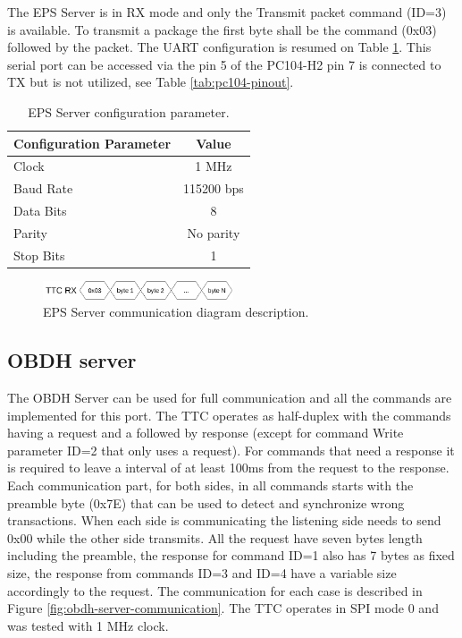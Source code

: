The EPS Server is in RX mode and only the Transmit packet command (ID=3) is available. To transmit a package the first byte shall be the command (0x03) followed by the packet. The UART configuration is resumed on Table \ref{tab:eps_config}. This serial port can be accessed via the pin 5 of the PC104-H2 pin 7 is connected to TX but is not utilized, see Table \ref{tab:pc104-pinout}.


\begin{table}[!ht]
    \centering
    \begin{tabular}{lc}
        \toprule[1.5pt]
        \textbf{Configuration Parameter} & \textbf{Value}\\
        \midrule
        Clock               & 1 MHz       \\
        Baud Rate           & 115200 bps  \\
        Data Bits           & 8           \\
        Parity              & No parity   \\
        Stop Bits           & 1           \\
        \bottomrule[1.5pt]
    \end{tabular}
    \caption{EPS Server configuration parameter.}
    \label{tab:eps_config}
\end{table}

\begin{figure}[!ht]
    \begin{center}
        \includegraphics[width=0.5\textwidth]{figures/eps_communication.drawio.png}
        \caption{EPS Server communication diagram description.}
        \label{fig:eps-server-communication}
    \end{center}
\end{figure}

\subsection{OBDH server}

The OBDH Server can be used for full communication and all the commands are implemented for this port. The TTC operates as half-duplex with the commands having a request and a followed by response (except for command Write parameter ID=2 that only uses a request). For commands that need a response it is required to leave a interval of at least 100ms from the request to the response. Each communication part, for both sides, in all commands starts with the preamble byte (0x7E) that can be used to detect and synchronize wrong transactions. When each side is communicating the listening side needs to send 0x00 while the other side transmits.
All the request have seven bytes length including the preamble, the response for command ID=1 also has 7 bytes as fixed size, the response from commands ID=3 and ID=4 have a variable size accordingly to the request. The communication for each case is described in Figure \ref{fig:obdh-server-communication}. The TTC operates in SPI mode 0 and was tested with 1 MHz clock.

